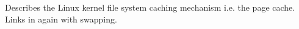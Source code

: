 Describes the Linux kernel file system caching mechanism i.e. the page
cache. Links in again with swapping.\\

